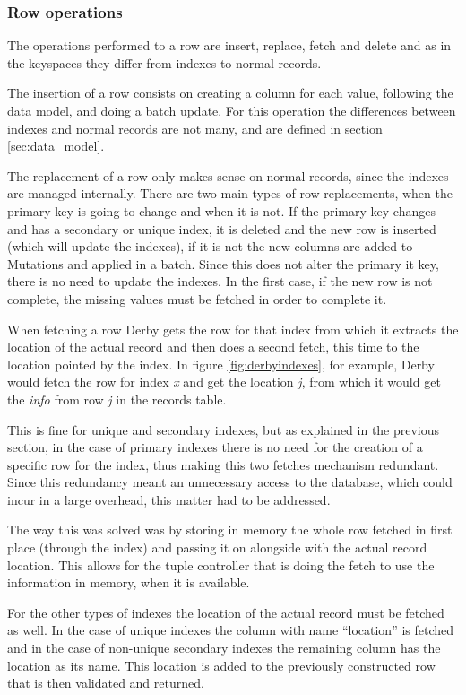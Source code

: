 \subsubsection{Row operations}
The operations performed to a row are insert, replace, fetch and delete and as in the keyspaces they differ from indexes to normal records.

The insertion of a row consists on creating a column for each value, following the data model, and doing a batch update. For this operation the differences between indexes and normal records are not many, and are defined in section \ref{sec:data_model}. 

The replacement of a row only makes sense on normal records, since the indexes are managed internally. There are two main types of row replacements, when the primary key is going to change and when it is not. If the primary key changes and has a secondary or unique index, it is deleted and the new row is inserted (which will update the indexes), if it is not the new columns are added to Mutations and applied in a batch. Since this does not alter the primary it key, there is no need to update the indexes. In the first case, if the new row is not complete, the missing values must be fetched in order to complete it.

When fetching a row Derby gets the row for that index from which it extracts the location of the actual record and then does a second fetch, this time to the location pointed by the index. In figure \ref{fig:derbyindexes}, for example, Derby would fetch the row for index \emph{x} and get the location \emph{j}, from which it would get the \emph{info} from row \emph{j} in the records table.

This is fine for unique and secondary indexes, but as explained in the previous section, in the case of primary indexes there is no need for the creation of a specific row for the index, thus making this two fetches mechanism redundant. Since this redundancy meant an unnecessary access to the database, which could incur in a large overhead, this matter had to be addressed. 

The way this was solved was by storing in memory the whole row fetched in first place (through the index) and passing it on alongside with the actual record location. This allows for the tuple controller that is doing the fetch to use the information in memory, when it is available.

For the other types of indexes the location of the actual record must be fetched as well. In the case of unique indexes the column with name ``location'' is fetched and in the case of non-unique secondary indexes the remaining column has the location as its name. This location is added to the previously constructed row that is then validated and returned.

